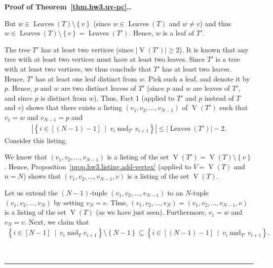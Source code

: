 \documentclass[numbers=enddot,12pt,final,onecolumn,notitlepage]{scrartcl}%
\theoremstyle{definition}
\newenvironment{proof}[1][Proof]{\noindent\textbf{#1.} }{\ \rule{0.5em}{0.5em}}
\newcommand{\set}[1]{\left\{ #1 \right\}}
\newcommand{\abs}[1]{\left| #1 \right|}
\newcommand{\tup}[1]{\left( #1 \right)}
\newcommand{\ive}[1]{\left[ #1 \right]}
\newcommand{\verts}[1]{\operatorname{V}\left( #1 \right)}
\newcommand{\leaves}[1]{\operatorname{Leaves}\left( #1 \right)}
\begin{document}
\begin{proof}[Proof of Theorem~\ref{thm.hw3.uv-pc}.]
\begin{itemize}
        But $w \in \leaves{T} \setminus \set{v}$ (since
        $w \in \leaves{T}$ and $w \neq v$) and thus
        $w \in \leaves{T} \setminus \set{v}
        = \leaves{T'}$.
        Hence, $w$ is a leaf of $T'$.
        
        The tree $T'$ has at least two vertices (since
        $\abs{\verts{T'}} \geq 2$).
        It is known that any tree with at least two vertices must
        have at least two leaves.
        Since $T'$ is a tree with at least two vertices, we thus
        conclude that $T'$ has at least two leaves.
        Hence, $T'$ has at least one leaf distinct from $w$.
        Pick such a leaf, and denote it by $p$.
        Hence, $p$ and $w$ are two distinct leaves of $T'$
        (since $p$ and $w$ are leaves of $T'$, and since $p$ is
        distinct from $w$).
        Thus, Fact 1 (applied to $T'$ and $p$ instead of $T$ and $v$)
        shows that there exists a listing
        $\tup{v_1, v_2, \ldots, v_{N-1}}$ of $\verts{T'}$ such that
        $v_1 = w$ and $v_{N-1} = p$ and
        \begin{align}
        \abs{\set{i \in \ive{\tup{N-1}-1} \ \mid \ v_i \operatorname{nad}_{T'} v_{i+1} }}
        \leq \abs{\leaves{T'}} - 2.
        \label{pf.thm.hw3.uv-pc.c2.1}
        \end{align}
        Consider this listing.
        
        We know that $\tup{v_1, v_2, \ldots, v_{N-1}}$ is a listing
        of the set $\verts{T'} = \verts{T} \setminus \set{v}$.
        Hence, Proposition~\ref{prop.hw3.listing.add-vertex}
        (applied to $V = \verts{T}$ and $n = N$) shows that
        $\tup{v_1, v_2, \ldots, v_{N-1}, v}$ is a listing of the
        set $\verts{T}$.
        
        Let us extend the $\tup{N-1}$-tuple
        $\tup{v_1, v_2, \ldots, v_{N-1}}$ to an $N$-tuple
        $\tup{v_1, v_2, \ldots, v_N}$ by setting $v_N = v$.
        Thus,
        $\tup{v_1, v_2, \ldots, v_N}
        = \tup{v_1, v_2, \ldots, v_{N-1}, v}$ is a listing of the
        set $\verts{T}$ (as we have just seen).
        Furthermore, $v_1 = w$ and $v_N = v$.
        Next, we claim that
        \begin{align}
        \set{i \in \ive{N-1} \ \mid \ v_i \operatorname{nad}_T v_{i+1} }
        \setminus \set{N-1}
        \subseteq
        \set{i \in \ive{\tup{N-1}-1} \ \mid \ v_i \operatorname{nad}_{T'} v_{i+1} } .
        \label{pf.thm.hw3.uv-pc.c2.2}
        \end{align}
        

\end{itemize}
\end{proof}
\end{document}
